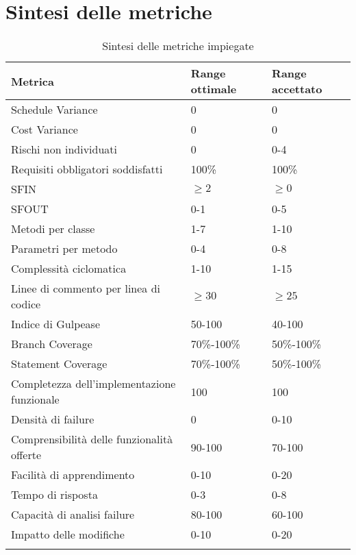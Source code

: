 \section{Sintesi delle metriche}
\begin{longtable}[H]{|C{5cm}|C{3.5cm}|C{3.5cm}|}
		\hline
		\textbf{Metrica} & \textbf{Range ottimale} & \textbf{Range accettato}  \\ \hline
		Schedule Variance & 0 & 0 \\ \hline
		Cost Variance & 0 & 0 \\ \hline
		Rischi non individuati & 0 & 0-4 \\ \hline
		Requisiti obbligatori soddisfatti & 100\% & 100\% \\ \hline
		SFIN & $\geq 2$ & $\geq 0$ \\ \hline
		SFOUT & 0-1 & 0-5 \\ \hline
		Metodi per classe & 1-7 & 1-10 \\ \hline
		Parametri per metodo & 0-4 & 0-8 \\ \hline
		Complessità ciclomatica & 1-10 & 1-15 \\ \hline
		Linee di commento per linea di codice & $\geq30$ & $\geq25$ \\ \hline
		Indice di Gulpease & 50-100 & 40-100 \\ \hline
		Branch Coverage & 70\%-100\% & 50\%-100\% \\ \hline
		Statement Coverage & 70\%-100\% & 50\%-100\% \\ \hline
		Completezza dell'implementazione funzionale & 100 & 100 \\ \hline
		Densità di failure & 0 & 0-10 \\ \hline
		Comprensibilità delle funzionalità offerte & 90-100 & 70-100 \\ \hline
		Facilità di apprendimento & 0-10 & 0-20 \\ \hline
		Tempo di risposta & 0-3 & 0-8 \\ \hline
		Capacità di analisi failure & 80-100 & 60-100 \\ \hline
		Impatto delle modifiche & 0-10 & 0-20 \\ \hline
		\caption{Sintesi delle metriche impiegate}
\end{longtable}
